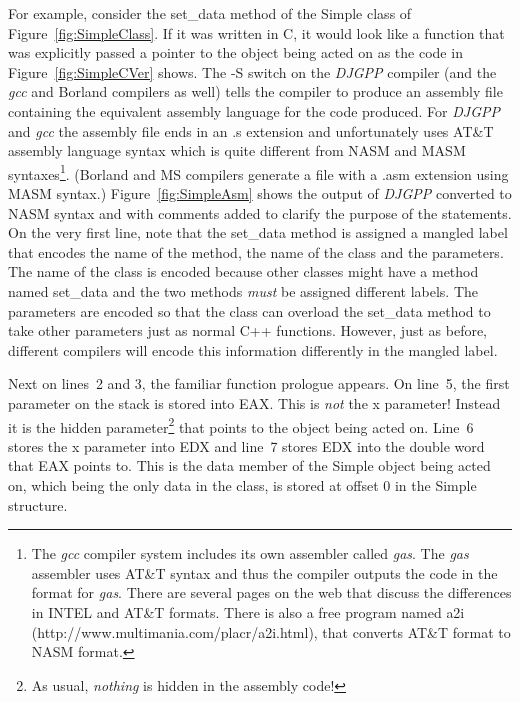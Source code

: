 For example, consider the {\code set\_data} method of the {\code
Simple} class of Figure~\ref{fig:SimpleClass}. If it was written in C,
it would look like a function that was explicitly passed a
pointer to the object being acted on as the code in
Figure~\ref{fig:SimpleCVer} shows.  The {\code -S} switch on the
\emph{DJGPP} compiler (and the \emph{gcc} and Borland compilers as
well) tells the compiler to produce an assembly file containing the
equivalent assembly language for the code produced.  For \emph{DJGPP}
and \emph{gcc} the assembly file ends in an {\code .s} extension and
unfortunately uses AT\&T assembly language syntax which is quite
different from NASM and MASM syntaxes\footnote{The \emph{gcc}
compiler system includes its own assembler called \emph{gas}. The
\emph{gas} assembler uses AT\&T syntax and thus the compiler outputs
the code in the format for \emph{gas}. There are several pages on the
web that discuss the differences in INTEL and AT\&T formats. There is
also a free program named {\code a2i}
({http://www.multimania.com/placr/a2i.html}), that converts AT\&T
format to NASM format.}. (Borland and MS compilers generate a file
with a {\code .asm} extension using MASM syntax.)
Figure~\ref{fig:SimpleAsm} shows the output of \emph{DJGPP} converted
to NASM syntax and with comments added to clarify the purpose of the
statements. On the very first line, note that the {\code set\_data}
method is assigned a mangled label that encodes the name of the
method, the name of the class and the parameters. The name of the
class is encoded because other classes might have a method named
{\code set\_data} and the two methods \emph{must} be assigned
different labels. The parameters are encoded so that the class can
overload the {\code set\_data} method to take other parameters just as
normal C++ functions. However, just as before, different compilers
will encode this information differently in the mangled label.

Next on lines~2 and 3, the familiar function prologue appears. On
line~5, the first parameter on the stack is stored into {\code
EAX}. This is \emph{not} the {\code x} parameter! Instead it is the
hidden parameter\footnote{As usual, \emph{nothing} is hidden in the
assembly code!} that points to the object being acted on. Line~6
stores the {\code x} parameter into {\code EDX} and line~7 stores
{\code EDX} into the double word that {\code EAX} points to. This is
the {\code data} member of the {\code Simple} object being acted on,
which being the only data in the class, is stored at offset 0 in the
{\code Simple} structure.

